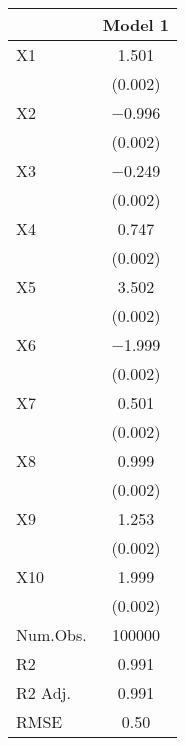 \begin{table}
\centering
\begin{tabular}[t]{lc}
\toprule
  & Model 1\\
\midrule
X1 & \num{1.501}\\
 & \vphantom{9} (\num{0.002})\\
X2 & \num{-0.996}\\
 & \vphantom{8} (\num{0.002})\\
X3 & \num{-0.249}\\
 & \vphantom{7} (\num{0.002})\\
X4 & \num{0.747}\\
 & \vphantom{6} (\num{0.002})\\
X5 & \num{3.502}\\
 & \vphantom{5} (\num{0.002})\\
X6 & \num{-1.999}\\
 & \vphantom{4} (\num{0.002})\\
X7 & \num{0.501}\\
 & \vphantom{3} (\num{0.002})\\
X8 & \num{0.999}\\
 & \vphantom{2} (\num{0.002})\\
X9 & \num{1.253}\\
 & \vphantom{1} (\num{0.002})\\
X10 & \num{1.999}\\
 & (\num{0.002})\\
\midrule
Num.Obs. & \num{100000}\\
R2 & \num{0.991}\\
R2 Adj. & \num{0.991}\\
RMSE & \num{0.50}\\
\end{tabular}
\end{table}
